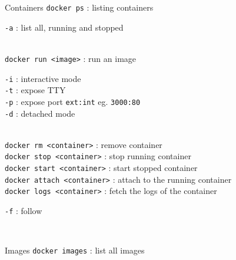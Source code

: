 \documentclass[10pt]{article}
\newcommand{\code}[1]{{\color{teal}\texttt{#1}}}
\begin{document}
\begin{multicols*}{2}

  \begin{mybox}{Containers}
    \code{docker ps} : listing containers \\[.3em]
    \hspace*{.5cm}\begin{minipage}{0.8\textwidth}
      \code{-a} : list all, running and stopped
    \end{minipage}\\[.5em]
    \code{docker run <image>} : run an image \\[.3em]
    \hspace*{.5cm}\begin{minipage}{0.9\textwidth}
      \code{-i} : interactive mode \\
      \code{-t} : expose TTY \\
      \code{-p} : expose port \code{ext:int} eg. \code{3000:80} \\
      \code{-d} : detached mode
    \end{minipage}\\[.5em]
    \code{docker rm <container>} : remove container \\[.3em]
    \code{docker stop <container>} : stop running container \\[.3em]
    \code{docker start <container>} : start stopped container \\[.3em]
    \code{docker attach <container>} : attach to the running container \\[.3em]
    \code{docker logs <container>} : fetch the logs of the container \\[.3em]
    \hspace*{.5cm}\begin{minipage}{0.9\textwidth}
      \code{-f} : follow
    \end{minipage}\\[.5em]
  \end{mybox}

  \begin{mybox}{Images}
    \code{docker images} : list all images \\[.3em]
  \end{mybox}

\end{multicols*}
\end{document}
